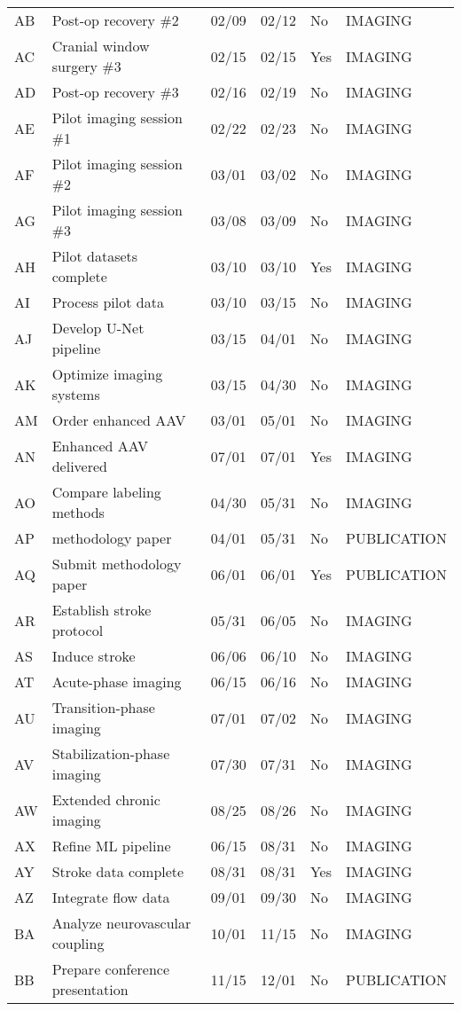\documentclass[portrait,a4paper]{article}
\begin{document}
\begin{longtable}{p{2cm}p{4cm}p{2cm}p{2cm}p{2cm}p{3cm}}
AB & Post-op recovery \#2 & 02/09 & 02/12 & No & IMAGING \\
AC & Cranial window surgery \#3 & 02/15 & 02/15 & Yes & IMAGING \\
AD & Post-op recovery \#3 & 02/16 & 02/19 & No & IMAGING \\
AE & Pilot imaging session \#1 & 02/22 & 02/23 & No & IMAGING \\
AF & Pilot imaging session \#2 & 03/01 & 03/02 & No & IMAGING \\
AG & Pilot imaging session \#3 & 03/08 & 03/09 & No & IMAGING \\
AH & Pilot datasets complete & 03/10 & 03/10 & Yes & IMAGING \\
AI & Process pilot data & 03/10 & 03/15 & No & IMAGING \\
AJ & Develop U-Net pipeline & 03/15 & 04/01 & No & IMAGING \\
AK & Optimize imaging systems & 03/15 & 04/30 & No & IMAGING \\
AM & Order enhanced AAV & 03/01 & 05/01 & No & IMAGING \\
AN & Enhanced AAV delivered & 07/01 & 07/01 & Yes & IMAGING \\
AO & Compare labeling methods & 04/30 & 05/31 & No & IMAGING \\
AP & methodology paper & 04/01 & 05/31 & No & PUBLICATION \\
AQ & Submit methodology paper & 06/01 & 06/01 & Yes & PUBLICATION \\
AR & Establish stroke protocol & 05/31 & 06/05 & No & IMAGING \\
AS & Induce stroke & 06/06 & 06/10 & No & IMAGING \\
AT & Acute-phase imaging & 06/15 & 06/16 & No & IMAGING \\
AU & Transition-phase imaging & 07/01 & 07/02 & No & IMAGING \\
AV & Stabilization-phase imaging & 07/30 & 07/31 & No & IMAGING \\
AW & Extended chronic imaging & 08/25 & 08/26 & No & IMAGING \\
AX & Refine ML pipeline & 06/15 & 08/31 & No & IMAGING \\
AY & Stroke data complete & 08/31 & 08/31 & Yes & IMAGING \\
AZ & Integrate flow data & 09/01 & 09/30 & No & IMAGING \\
BA & Analyze neurovascular coupling & 10/01 & 11/15 & No & IMAGING \\
BB & Prepare conference presentation & 11/15 & 12/01 & No & PUBLICATION \\

\end{longtable}
\end{document}
